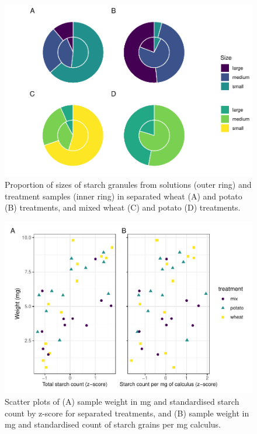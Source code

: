 \documentclass[utf8]{../templates/frontiersSCNS}
\begin{document}
\begin{figure}[H]

{\centering \includegraphics{../figures/ratio-plots-1} 

}

\caption{Proportion of sizes of starch granules from solutions (outer ring) and treatment samples (inner ring) in separated wheat (A) and potato (B) treatments, and mixed wheat (C) and potato (D) treatments.}\label{fig:ratio-plots}
\end{figure}

\begin{figure}[H]

{\centering \includegraphics{../figures/cor-plot-1} 

}

\caption{Scatter plots of (A) sample weight in mg and standardised starch count by z-score for separated treatments, and (B) sample weight in mg and standardised count of starch grains per mg calculus.}\label{fig:cor-plot}
\end{figure}
\end{document}
